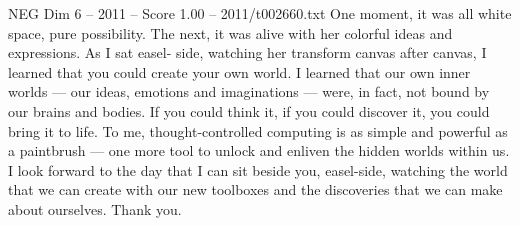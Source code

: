 \begin{textsample}{NEG Dim 6 – 2011 – Score 1.00 – 2011/t002660.txt}
One moment, it was all white space, pure possibility.
The next, it was alive with her colorful ideas and expressions.
As I sat easel- side, watching her transform canvas after canvas, I learned that you could create your own world.
I learned that our own inner worlds — our ideas, emotions and imaginations — were, in fact, not bound by our brains and bodies.
If you could think it, if you could discover it, you could bring it to life.
To me, thought-controlled computing is as simple and powerful as a paintbrush — one more tool to unlock and enliven the hidden worlds within us.
I look forward to the day that I can sit beside you, easel-side, watching the world that we can create with our new toolboxes and the discoveries that we can make about ourselves.
Thank you.

\end{textsample}
